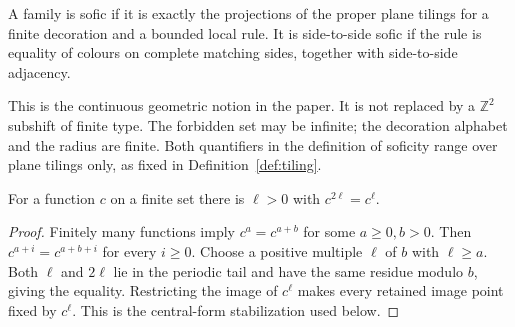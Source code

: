 \begin{definition}[Soficity]\label{def:sofic}
A family is sofic if it is exactly the projections of the proper plane
tilings for a finite decoration and a bounded local rule.
It is side-to-side sofic if the rule is equality of colours on complete
matching sides, together with side-to-side adjacency.
\end{definition}

This is the continuous geometric notion in the paper. It is not replaced
by a $\mathbb Z^2$ subshift of finite type. The forbidden set may be infinite;
the decoration alphabet and the radius are finite. Both quantifiers in the
definition of soficity range over plane tilings only, as fixed in
Definition~\ref{def:tiling}.

\begin{lemma}
\label{lem:finite-idempotent}
For a function $c$ on a finite set there is $\ell>0$ with $c^{2\ell}=c^\ell$.
\end{lemma}
\begin{proof}
Finitely many functions imply $c^a=c^{a+b}$ for some $a\geq0,b>0$.
Then $c^{a+i}=c^{a+b+i}$ for every $i\geq0$. Choose a positive multiple
$\ell$ of $b$ with $\ell\geq a$. Both $\ell$ and $2\ell$ lie in the periodic
tail and have the same residue modulo $b$, giving the equality.
Restricting the image of $c^\ell$ makes every retained image point fixed
by $c^\ell$. This is the central-form stabilization used below.
\end{proof}
